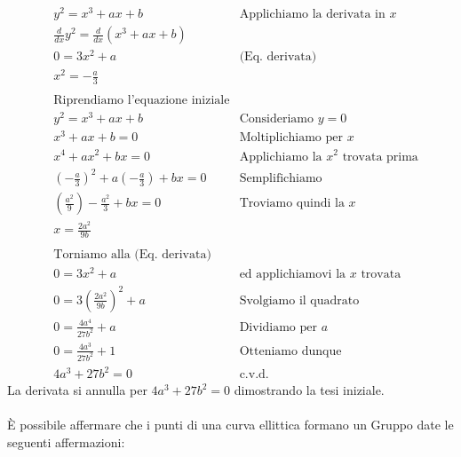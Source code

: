 \documentclass[a4paper,12pt]{tesiinfo}
\newcommand\ddfrac[2]{\frac{\displaystyle #1}{\displaystyle #2}}
\begin{document}
\begin{align*}
&y^2 = x^3 + ax+b &\text{Applichiamo la derivata in $x$}\\
&\ddfrac{d}{dx}y^2 = \ddfrac{d}{dx}(x^3 +ax+b)\\
&0 = 3x^2 +a &\text{(Eq. derivata)}\\
&x^2 = -\ddfrac{a}{3}\\
\\
&\text{Riprendiamo l'equazione iniziale}\\
&y^2 = x^3 + ax+b &\text{Consideriamo $y=0$}\\
&x^3 + ax+b = 0 &\text{Moltiplichiamo per $x$}\\
&x^4 + ax^2+bx = 0 &\text{Applichiamo la $x^2$ trovata prima}\\
& \left (-\ddfrac{a}{3} \right )^2 + a \left (-\ddfrac{a}{3}\right )+bx = 0 &\text{Semplifichiamo}\\
&\left (\ddfrac{a^2}{9} \right ) - \ddfrac{a^2}{3}+bx = 0 &\text{Troviamo quindi la $x$}\\
&x = \ddfrac{2a^2}{9b} \\
\\
&\text{Torniamo alla (Eq. derivata)}\\
&0 = 3x^2 +a &\text{ed applichiamovi la $x$ trovata}\\
&0 = 3 \left (\ddfrac{2a^2}{9b} \right )^2 +a &\text{Svolgiamo il quadrato}\\
&0 = \ddfrac{4a^4}{27b^2} +a &\text{Dividiamo per $a$}\\
&0 = \ddfrac{4a^3}{27b^2} +1 &\text{Otteniamo dunque}\\
&4a^3+27b^2 = 0 &\text{c.v.d.}
\end{align*}
La derivata si annulla per $4a^3+27b^2 = 0$ dimostrando la tesi iniziale.
\\
\\
\`E possibile affermare che i punti di una curva ellittica formano un Gruppo date le seguenti affermazioni:
\end{document}
